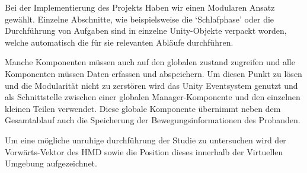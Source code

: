 Bei der Implementierung des Projekts Haben wir einen Modularen Ansatz gewählt. Einzelne Abschnitte, wie beispielsweise die `Schlafphase' oder die Durchführung von Aufgaben sind in einzelne Unity-Objekte verpackt worden, welche automatisch die für sie relevanten Abläufe durchführen. 

Manche Komponenten müssen auch auf den globalen zustand zugreifen und alle Komponenten müssen Daten erfassen und abspeichern. Um diesen Punkt zu lösen und die Modularität nicht zu zerstören wird das Unity Eventsystem genutzt und als Schnittstelle zwischen einer globalen Manager-Komponente und den einzelnen kleinen Teilen verwendet. 
Diese globale Komponente übernimmt neben dem Gesamtablauf auch die Speicherung der Bewegungsinformationen des Probanden. 

Um eine mögliche unruhige durchführung der Studie zu untersuchen wird der Vorwärts-Vektor des HMD sowie die Position dieses innerhalb der Virtuellen Umgebung aufgezeichnet. 
